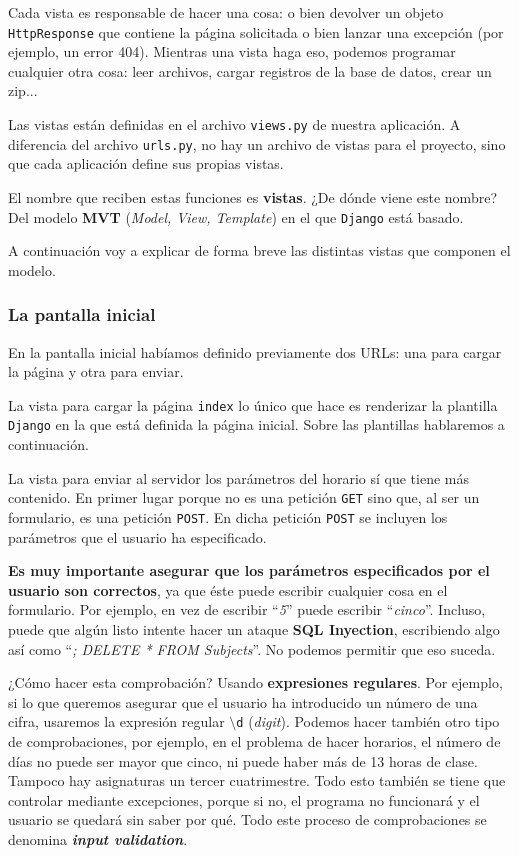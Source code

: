 Cada vista es responsable de hacer una cosa: o bien devolver un objeto \texttt{HttpResponse} que contiene la página solicitada o bien lanzar una excepción (por ejemplo, un error 404). Mientras una vista haga eso, podemos programar cualquier otra cosa: leer archivos, cargar registros de la base de datos, crear un zip...

Las vistas están definidas en el archivo \texttt{views.py} de nuestra aplicación. A diferencia del archivo \texttt{urls.py}, no hay un archivo de vistas para el proyecto, sino que cada aplicación define sus propias vistas.

El nombre que reciben estas funciones es \textbf{vistas}. ¿De dónde viene este nombre? Del modelo \textbf{MVT} (\textit{Model, View, Template}) en el que \texttt{Django} está basado.

A continuación voy a explicar de forma breve las distintas vistas que componen el modelo.

\subsubsection{La pantalla inicial}
En la pantalla inicial habíamos definido previamente dos URLs: una para cargar la página y otra para enviar.

La vista para cargar la página \texttt{index} lo único que hace es renderizar la plantilla \texttt{Django} en la que está definida la página inicial. Sobre las plantillas hablaremos a continuación.

La vista para enviar al servidor los parámetros del horario sí que tiene más contenido. En primer lugar porque no es una petición \texttt{GET} sino que, al ser un formulario, es una petición \texttt{POST}. En dicha petición \texttt{POST} se incluyen los parámetros que el usuario ha especificado. 

\textbf{Es muy importante asegurar que los parámetros especificados por el usuario son correctos}, ya que éste puede escribir cualquier cosa en el formulario. Por ejemplo, en vez de escribir ``\textit{5}'' puede escribir ``\textit{cinco}''. Incluso, puede que algún listo intente hacer un ataque \textbf{SQL Inyection}, escribiendo algo así como ``\textit{; DELETE * FROM Subjects}''. No podemos permitir que eso suceda. 

¿Cómo hacer esta comprobación? Usando \textbf{expresiones regulares}. Por ejemplo, si lo que queremos asegurar que el usuario ha introducido un número de una cifra, usaremos la expresión regular \texttt{$\setminus$d} (\textit{digit}). Podemos hacer también otro tipo de comprobaciones, por ejemplo, en el problema de hacer horarios, el número de días no puede ser mayor que cinco, ni puede haber más de 13 horas de clase. Tampoco hay asignaturas un tercer cuatrimestre. Todo esto también se tiene que controlar mediante excepciones, porque si no, el programa no funcionará y el usuario se quedará sin saber por qué. Todo este proceso de comprobaciones se denomina \textbf{\textit{input validation}}.

